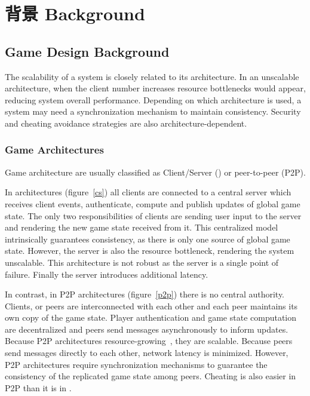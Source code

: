 \chapter{背景 Background}
\label{background}


\section{Game Design Background}
\label{gamedesignbg}

The scalability of a system is closely related to its architecture. In an unscalable architecture, when the client number increases resource bottlenecks would appear, reducing system overall performance. Depending on which architecture is used, a system may need a synchronization mechanism to maintain consistency. Security and cheating avoidance strategies are also architecture-dependent.

\subsection{Game Architectures}
\label{game_archi}

Game architecture are usually classified as Client\slash Server (\cs) or peer-to-peer (P2P). 

In {\cs} architectures (figure~\ref{cs}) all clients are connected to a central server which receives client events, authenticate, compute and publish updates of global game state. The only two responsibilities of clients are sending user input to the server and rendering the new game state received from it. This centralized model intrinsically guarantees consistency, as there is only one source of global game state. However, the server is also the resource bottleneck, rendering the system unscalable. This architecture is not robust as the server is a single point of failure. Finally the server introduces additional latency.

In contrast, in P2P architectures (figure~\ref{p2p}) there is no central authority. Clients, or peers are interconnected with each other and each peer maintains its own copy of the game state. Player authentication and game state computation are decentralized and peers send messages asynchronously to inform updates. Because P2P architectures resource-growing~\cite{Scheating}, they are scalable. Because peers send messages directly to each other, network latency is minimized. However, P2P architectures require synchronization mechanisms to guarantee the consistency of the replicated game state among peers. Cheating is also easier in P2P than it is in {\cs}.

